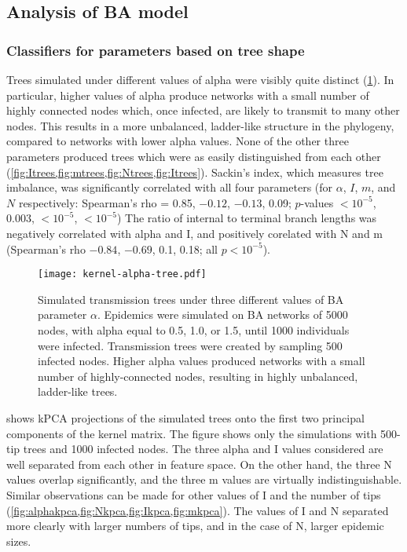 \subsection{Analysis of \acrlong{BA} model}



\subsubsection*{Classifiers for parameters based on tree shape}



Trees simulated under different values of \gls{alpha} were visibly quite
distinct (\cref{fig:alphatrees}). In particular, higher values of \gls{alpha}
produce networks with a small number of highly connected nodes which, once
infected, are likely to transmit to many other nodes. This results in a more
unbalanced, ladder-like structure in the phylogeny, compared to networks with
lower \gls{alpha} values. None of the other three parameters produced trees
which were as easily distinguished from each other
(\cref{fig:Itrees,fig:mtrees,fig:Ntrees,fig:Itrees}).  Sackin's index, which
measures tree imbalance, was significantly correlated with all four parameters
    (for $\alpha$, $I$, $m$, and $N$ respectively: Spearman's rho =
     0.85,
     \ensuremath{-0.12},
     \ensuremath{-0.13},
     0.09;
     $p$-values
     ${<}10^{-5}$,
     $0.003$,
     ${<}10^{-5}$,
     ${<}10^{-5}$)
The ratio of internal to terminal branch lengths was negatively correlated with
\gls{alpha} and \gls{I}, and positively corelated with \gls{N} and \gls{m}
  (Spearman's rho
    \ensuremath{-0.84},
    \ensuremath{-0.69},
    0.1,
    0.18;
  all $p < 10^{-5}$).

\begin{figure}[ht]
  \centering
  \texttt{[image: kernel-alpha-tree.pdf]}
  \caption[Simulated transmission trees under three different values of BA parameter $\alpha$]{
    Simulated transmission trees under three different values of BA parameter
    $\alpha$. Epidemics were simulated on \gls{BA} networks of 5000 nodes, with
    \gls{alpha} equal to 0.5, 1.0, or 1.5, until 1000 individuals were
    infected. Transmission trees were created by sampling 500 infected nodes.
    Higher \gls{alpha} values produced networks with a small number of
    highly-connected nodes, resulting in highly unbalanced, ladder-like trees.
  }
  \label{fig:alphatrees}
\end{figure}

 shows \gls{kPCA} projections of the simulated trees onto the
first two principal components of the kernel matrix. The figure shows only the
simulations with 500-tip trees and 1000 infected nodes. The three \gls{alpha}
and \gls{I} values considered are well separated from each other in feature
space. On the other hand, the three \gls{N} values overlap significantly, and
the three \gls{m} values are virtually indistinguishable. Similar observations
can be made for other values of \gls{I} and the number of tips
(\cref{fig:alphakpca,fig:Nkpca,fig:Ikpca,fig:mkpca}). The values of \gls{I} and
\gls{N} separated more clearly with larger numbers of tips, and in the case of
\gls{N}, larger epidemic sizes.

